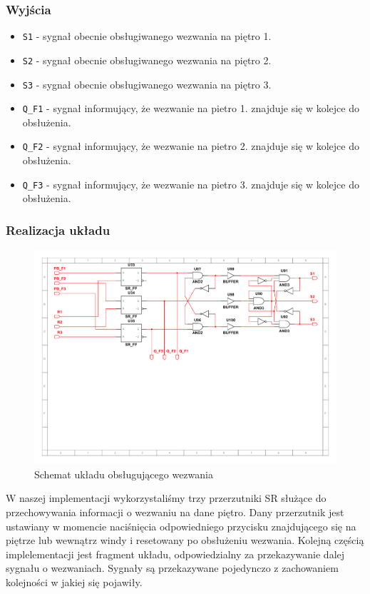\documentclass[a4paper]{article}
\begin{document}
\subsubsection{Wyjścia}
\begin{itemize}
    \item \verb|S1| - sygnał obecnie obsługiwanego wezwania na piętro 1.
    \item \verb|S2| - sygnał obecnie obsługiwanego wezwania na piętro 2.
    \item \verb|S3| - sygnał obecnie obsługiwanego wezwania na piętro 3.
    \item \verb|Q_F1| - sygnał informujący, że wezwanie na pietro 1. znajduje się w kolejce do obsłużenia.
    \item \verb|Q_F2| - sygnał informujący, że wezwanie na pietro 2. znajduje się w kolejce do obsłużenia.
    \item \verb|Q_F3| - sygnał informujący, że wezwanie na pietro 3. znajduje się w kolejce do obsłużenia.
\end{itemize}

\subsubsection{Realizacja układu}
\begin{figure}[H]
    \centering
    \includegraphics[width=\textwidth]{call_controller.png_schemat.pdf}
    \caption{Schemat układu obsługującego wezwania}
\end{figure}

W naszej implementacji wykorzystaliśmy trzy przerzutniki SR służące do przechowywania
informacji o wezwaniu na dane piętro. Dany przerzutnik jest ustawiany w momencie naciśnięcia odpowiedniego 
przycisku znajdującego się na piętrze lub wewnątrz windy i resetowany po obsłużeniu wezwania.
Kolejną częścią implelementacji jest fragment układu, odpowiedzialny za przekazywanie dalej sygnału o wezwaniach.
Sygnały są przekazywane pojedynczo z zachowaniem kolejności w jakiej się pojawiły. 
\end{document}
